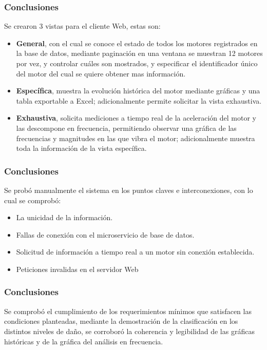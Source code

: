 \documentclass{beamer}
\begin{document}
\begin{frame}
    \frametitle{Conclusiones}
    \large
        Se crearon 3 vistas para el cliente Web, estas son:
        \begin{itemize}
            \item \textbf{General}, con el cual se conoce el estado de todos
                los motores registrados en la base de datos, mediante paginación
                en una ventana se muestran 12 motores por vez, y controlar
                cuáles son mostrados,
                y especificar el identificador
                único del motor del cual se quiere obtener mas información.
            \item \textbf{Específica},
                muestra la evolución histórica del motor mediante gráficas
                y una tabla exportable a Excel; adicionalmente permite solicitar
                la vista exhaustiva.
            \item \textbf{Exhaustiva},
                solicita mediciones a tiempo real de la aceleración del motor
                y las descompone en frecuencia, permitiendo observar una gráfica
                de las frecuencias y magnitudes  en las que vibra
                el motor; adicionalmente muestra toda la información de la
                vista específica.
        \end{itemize}

\end{frame}

\begin{frame}
    \frametitle{Conclusiones}
    \large
        Se probó manualmente el sistema en los puntos claves
        e interconexiones, con lo cual  se comprobó:
        \begin{itemize}
            \item La unicidad de la información.
            \item Fallas de conexión con el microservicio de base de datos.
            \item Solicitud de información a tiempo real a un motor sin conexión
                establecida.
            \item Peticiones invalidas en el servidor Web
        \end{itemize}
\end{frame}

\begin{frame}
    \frametitle{Conclusiones}
    \large
        Se comprobó el cumplimiento de
        los requerimientos mínimos que satisfacen las condiciones planteadas,
        mediante la
        demostración de la clasificación en los distintos niveles de daño,
         se corroboró la coherencia y legibilidad
        de las gráficas históricas y de la gráfica del análisis en frecuencia.
\end{frame}
\end{document}
